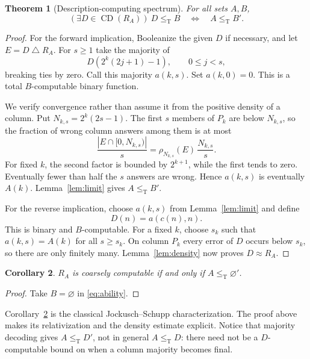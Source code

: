 \documentclass[11pt,a4paper]{article}
\newcommand{\leT}{\leq_{\mathrm T}}
\newcommand{\CD}{\operatorname{CD}}
\newtheorem{theorem}{Theorem}[section]
\newtheorem{corollary}[theorem]{Corollary}
\theoremstyle{definition}\newtheorem{definition}[theorem]{Definition}
\theoremstyle{remark}\newtheorem{remark}[theorem]{Remark}
\begin{document}
\begin{theorem}[Description-computing spectrum]\label{thm:ability}
For all sets $A,B$,
\begin{equation}\label{eq:ability}
 (\exists D\in\CD(R_A))\ D\leT B
 \quad\Longleftrightarrow\quad A\leT B'.
\end{equation}
\end{theorem}
\begin{proof}
For the forward implication, Booleanize the given $D$ if necessary, and let $E=D\mathbin\triangle R_A$. For $s\geq1$ take the majority of
\[
 D(2^k(2j+1)-1),\qquad 0\leq j<s,
\]
breaking ties by zero. Call this majority $a(k,s)$. Set $a(k,0)=0$. This is a total $B$-computable binary function.

We verify convergence rather than assume it from the positive density of a column. Put $N_{k,s}=2^k(2s-1)$. The first $s$ members of $P_k$ are below $N_{k,s}$, so the fraction of wrong column answers among them is at most
\[
 \frac{|E\cap[0,N_{k,s})|}{s}
 =\rho_{N_{k,s}}(E)\,\frac{N_{k,s}}{s}.
\]
For fixed $k$, the second factor is bounded by $2^{k+1}$, while the first tends to zero. Eventually fewer than half the $s$ answers are wrong. Hence $a(k,s)$ is eventually $A(k)$. Lemma~\ref{lem:limit} gives $A\leT B'$.

For the reverse implication, choose $a(k,s)$ from Lemma~\ref{lem:limit} and define
\begin{equation}\label{eq:approxD}
 D(n)=a(c(n),n).
\end{equation}
This is binary and $B$-computable. For a fixed $k$, choose $s_k$ such that $a(k,s)=A(k)$ for all $s\geq s_k$. On column $P_k$ every error of $D$ occurs below $s_k$, so there are only finitely many. Lemma~\ref{lem:density} now proves $D\approx R_A$.
\end{proof}

\begin{corollary}\label{cor:zero}
$R_A$ is coarsely computable if and only if $A\leT\varnothing'$.
\end{corollary}
\begin{proof}
Take $B=\varnothing$ in \eqref{eq:ability}.
\end{proof}

Corollary~\ref{cor:zero} is the classical Jockusch--Schupp characterization.\cite[Theorem~2.19]{JS} The proof above makes its relativization and the density estimate explicit. Notice that majority decoding gives $A\leT D'$, not in general $A\leT D$: there need not be a $D$-computable bound on when a column majority becomes final.
\end{document}
